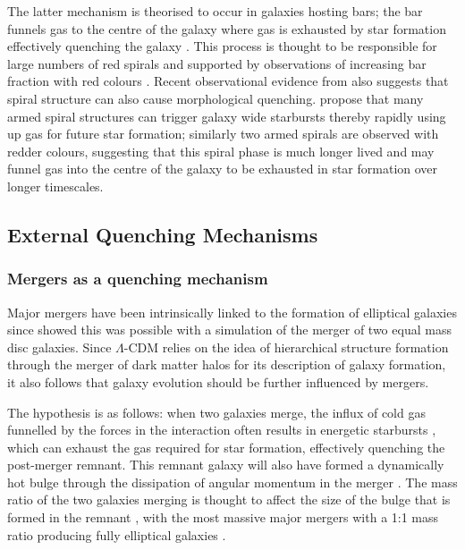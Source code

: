 The latter mechanism is theorised to occur in galaxies hosting bars; the bar funnels gas to the centre of the galaxy \citep{athanassoula92a} where gas is exhausted by star formation effectively quenching the galaxy \citep{zurita04, sheth05}. This process is thought to be responsible for large numbers of red spirals and supported by observations of increasing bar fraction with red colours \citep{masters11a}. Recent observational evidence from \cite{hart16} also suggests that spiral structure can also cause morphological quenching. \citeauthor{hart16} propose that many armed spiral structures can trigger galaxy wide starbursts thereby rapidly using up gas for future star formation; similarly two armed spirals are observed with redder colours, suggesting that this spiral phase is much longer lived and may funnel gas into the centre of the galaxy to be exhausted in star formation over longer timescales.  
  
\subsection{External Quenching Mechanisms}\label{sec:extquench}
  
\subsubsection{Mergers as a quenching mechanism}\label{sec:mergersquench}

Major mergers have been intrinsically linked to the formation of elliptical galaxies since \citet{toomre72} showed this was possible with a simulation of the merger of two equal mass disc galaxies. Since $\Lambda$-CDM relies on the idea of hierarchical structure formation through the merger of dark matter halos for its description of galaxy formation, it also follows that galaxy evolution should be further influenced by mergers. 

The hypothesis is as follows: when two galaxies merge, the influx of cold gas funnelled by the forces in the interaction often results in energetic starbursts \citep{mihos94, mihos96, hopkins06d, hopkins08a, hopkins08b, snyder11, hayward14, sparre16}, which can exhaust the gas required for star formation, effectively quenching the post-merger remnant. This remnant galaxy will also have formed a dynamically hot bulge through the dissipation of angular momentum in the merger \citep{toomre77, walker96, kormendy04, hopkins11c, martig12}. The mass ratio of the two galaxies merging is thought to affect the size of the bulge that is formed in the remnant \citep{cox08, hopkins09c, tonini16}, with the most massive major mergers with a 1:1 mass ratio producing fully elliptical galaxies \citep{toomre72, barnes96, mihos96, kauffmann96, pontzen16}.

